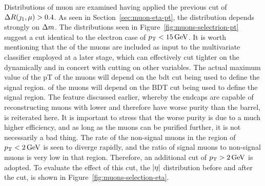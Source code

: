 Distributions of muon \pt are examined having applied the previous cut of $\Delta R(\jmath_1,\mu)>0.4$. As seen in Section~\ref{sec:muon-eta-pt}, the \pt distribution depends strongly on $\Delta m$. The \pt distributions seen in Figure~\ref{fig:muons-selectrion-pt} suggest a cut identical to the electron case of $p_{\mathrm{T}}<15\,\text{Ge\hspace{-.08em}V}$. It is worth mentioning that the \pt of the muons are included as input to the multivariate classifier employed at a later stage, which can effectively cut tighter on the \pt dynamically and in concert with cutting on other variables. The actual maximum value of the pT of the muons will depend on the \gls{bdt} cut being used to define the signal region. \pt of the muons will depend on the BDT cut being used to define the signal region. The feature discussed earlier, whereby the endcaps are capable of reconstructing muons with lower \pt and therefore have worse purity than the barrel, is reiterated here. It is important to stress that the worse purity is due to a much higher efficiency, and as long as the muons can be purified further, it is not necessarily a bad thing. The rate of  the non-signal muons in the region of $p_{\mathrm{T}}<2\,\text{Ge\hspace{-.08em}V}$ is seen to diverge rapidly, and the ratio of signal muons to non-signal muons is very low in that region. Therefore, an additional cut of $p_{\mathrm{T}}>2\,\text{Ge\hspace{-.08em}V}$ is adopted. To evaluate the effect of this cut, the $\abs{\eta}$ distribution before and after the \pt cut, is shown in Figure~\ref{fig:muons-selection-eta}.

